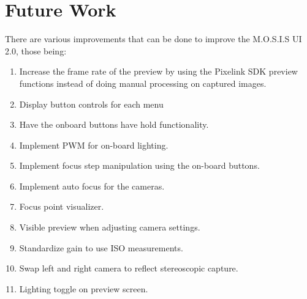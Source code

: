 \section{Future Work}
There are various improvements that can be done to improve the M.O.S.I.S UI 2.0, those being:
\begin{enumerate}
	\item Increase the frame rate of the preview by using the Pixelink SDK preview functions instead of doing manual processing on captured images.
	\item Display button controls for each menu
	\item Have the onboard buttons have hold functionality.
	\item Implement PWM for on-board lighting.
	\item Implement focus step manipulation using the on-board buttons.
	\item Implement auto focus for the cameras.
	\item Focus point visualizer.
	\item Visible preview when adjusting camera settings.
	\item Standardize gain to use ISO measurements.
	\item Swap left and right camera to reflect stereoscopic capture.
	\item Lighting toggle on preview screen.
\end{enumerate}